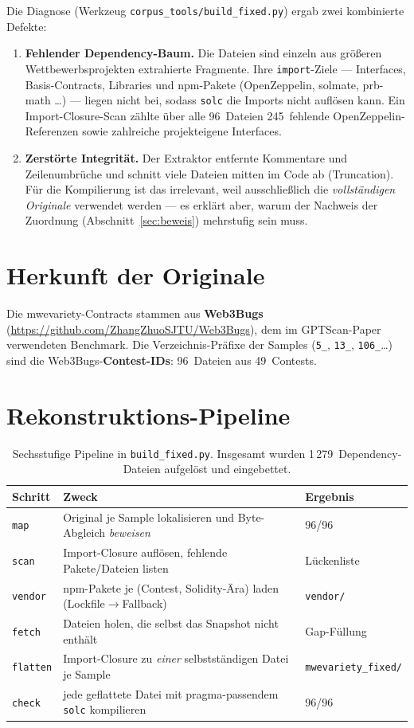 \documentclass[11pt,a4paper]{scrartcl}
\newcommand{\code}[1]{\texttt{#1}}
\begin{document}
Die Diagnose (Werkzeug \code{corpus\_tools/build\_fixed.py}) ergab zwei
kombinierte Defekte:
\begin{enumerate}[leftmargin=1.5em]
  \item \textbf{Fehlender Dependency-Baum.} Die Dateien sind einzeln aus größeren
    Wettbewerbsprojekten extrahierte Fragmente. Ihre \code{import}-Ziele ---
    Interfaces, Basis-Contracts, Libraries und npm-Pakete (OpenZeppelin, solmate,
    prb-math \dots) --- liegen nicht bei, sodass \code{solc} die Imports nicht auflösen
    kann. Ein Import-Closure-Scan zählte über alle 96~Dateien 245~fehlende
    OpenZeppelin-Referenzen sowie zahlreiche projekteigene Interfaces.
  \item \textbf{Zerstörte Integrität.} Der Extraktor entfernte Kommentare und
    Zeilenumbrüche und schnitt viele Dateien mitten im Code ab (Truncation). Für die
    Kompilierung ist das irrelevant, weil ausschließlich die \emph{vollständigen
    Originale} verwendet werden --- es erklärt aber, warum der Nachweis der Zuordnung
    (Abschnitt~\ref{sec:beweis}) mehrstufig sein muss.
\end{enumerate}

\section{Herkunft der Originale}

Die mwevariety-Contracts stammen aus \textbf{Web3Bugs}
(\url{https://github.com/ZhangZhuoSJTU/Web3Bugs}), dem im GPTScan-Paper
verwendeten Benchmark. Die Verzeichnis-Präfixe der Samples (\code{5\_}, \code{13\_},
\code{106\_}\dots) sind die Web3Bugs-\textbf{Contest-IDs}: 96~Dateien aus
49~Contests.

\section{Rekonstruktions-Pipeline}

\begin{table}[h]
\centering
\begin{tabularx}{\linewidth}{@{}lX l@{}}
\toprule
Schritt & Zweck & Ergebnis \\
\midrule
\code{map}     & Original je Sample lokalisieren und Byte-Abgleich \emph{beweisen} & 96/96 \\
\code{scan}    & Import-Closure auflösen, fehlende Pakete/Dateien listen & Lückenliste \\
\code{vendor}  & npm-Pakete je (Contest, Solidity-Ära) laden (Lockfile$\to$Fallback) & \code{vendor/} \\
\code{fetch}   & Dateien holen, die selbst das Snapshot nicht enthält & Gap-Füllung \\
\code{flatten} & Import-Closure zu \emph{einer} selbstständigen Datei je Sample & \code{mwevariety\_fixed/} \\
\code{check}   & jede geflattete Datei mit pragma-passendem \code{solc} kompilieren & 96/96 \\
\bottomrule
\end{tabularx}
\caption{Sechsstufige Pipeline in \code{build\_fixed.py}. Insgesamt wurden
1\,279~Dependency-Dateien aufgelöst und eingebettet.}
\end{table}
\end{document}
